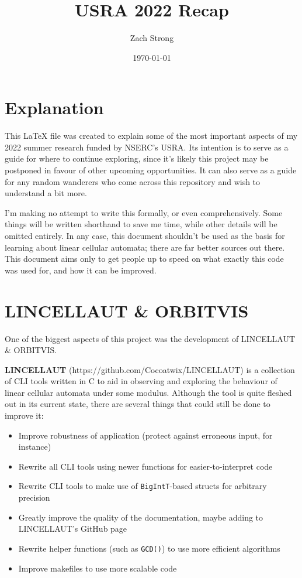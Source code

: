 \documentclass[a4paper, 12pt, reqno]{amsart}
\title{USRA 2022 Recap}
\author{Zach Strong}
\date{\today}
\newcommand{\ssection}[1]{\vspace{1cm}\section{#1}}
\begin{document}
	\maketitle
	\tableofcontents
	
	\ssection{Explanation}
		This LaTeX file was created to explain some of the most important aspects of my 2022 summer 
		research funded by NSERC's USRA. Its intention is to serve as a guide for where to continue
		exploring, since it's likely this project may be postponed in favour of other upcoming
		opportunities. It can also serve as a guide for any random wanderers who come across this
		repository and wish to understand a bit more.
		
		I'm making no attempt to write this formally, or even comprehensively. Some things will be
		written shorthand to save me time, while other details will be omitted entirely. In any
		case, this document shouldn't be used as the basis for learning about linear cellular
		automata; there are far better sources out there. This document aims only to get people
		up to speed on what exactly this code was used for, and how it can be improved.
	
	\ssection{LINCELLAUT \& ORBITVIS}
		One of the biggest aspects of this project was the development of LINCELLAUT \& ORBITVIS.
		
		\textbf{LINCELLAUT} (https://github.com/Cocoatwix/LINCELLAUT) is a collection of CLI tools written 
		in C to aid in observing and exploring the behaviour of linear cellular automata under some modulus. 
		Although the tool is quite fleshed out in its current state, there are several things that could 
		still be done to improve it:
		\begin{itemize}
			\item Improve robustness of application (protect against erroneous input, for instance)
			\item Rewrite all CLI tools using newer functions for easier-to-interpret code
			\item Rewrite CLI tools to make use of \texttt{BigIntT}-based structs for arbitrary precision
			\item Greatly improve the quality of the documentation, maybe adding to LINCELLAUT's GitHub page
			\item Rewrite helper functions (such as \texttt{GCD()}) to use more efficient algorithms
			\item Improve makefiles to use more scalable code
		\end{itemize}
		
\end{document}
